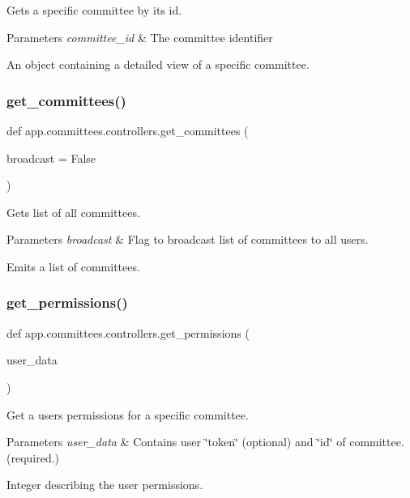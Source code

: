 Gets a specific committee by its id. 


\begin{DoxyParams}{Parameters}
{\em committee\+\_\+id} & The committee identifier\\
\hline
\end{DoxyParams}
An object containing a detailed view of a specific committee. \mbox{\label{namespaceapp_1_1committees_1_1controllers_a13062ac4ed1e797b5015282df19f6171}} 
\subsubsection{\texorpdfstring{get\+\_\+committees()}{get\_committees()}}
{\footnotesize\ttfamily def app.\+committees.\+controllers.\+get\+\_\+committees (\begin{DoxyParamCaption}\item[{}]{broadcast = {\ttfamily False} }\end{DoxyParamCaption})}



Gets list of all committees. 


\begin{DoxyParams}{Parameters}
{\em broadcast} & Flag to broadcast list of committees to all users.\\
\hline
\end{DoxyParams}
Emits a list of committees. \mbox{\label{namespaceapp_1_1committees_1_1controllers_a3583100187139ebf105b562438e9bf7a}} 
\subsubsection{\texorpdfstring{get\+\_\+permissions()}{get\_permissions()}}
{\footnotesize\ttfamily def app.\+committees.\+controllers.\+get\+\_\+permissions (\begin{DoxyParamCaption}\item[{}]{user\+\_\+data }\end{DoxyParamCaption})}



Get a users permissions for a specific committee. 


\begin{DoxyParams}{Parameters}
{\em user\+\_\+data} & Contains user \char`\"{}token\char`\"{} (optional) and \char`\"{}id\char`\"{} of committee. (required.)\\
\hline
\end{DoxyParams}
Integer describing the user permissions. 